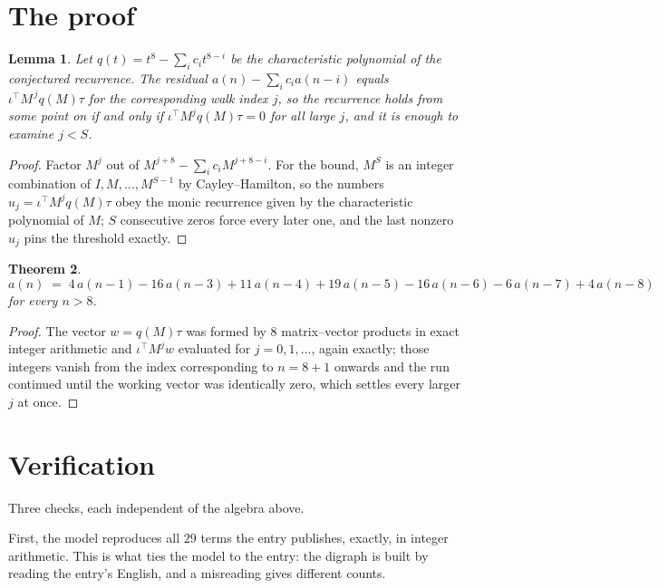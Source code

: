 \documentclass[11pt,a4paper]{article}
\theoremstyle{plain}
\newtheorem{theorem}{Theorem}
\newtheorem{lemma}[theorem]{Lemma}
\theoremstyle{definition}
\begin{document}
\section{The proof}

\begin{lemma}\label{lem:crit}
Let $q(t)=t^{8}-\sum_i c_it^{8-i}$ be the characteristic polynomial of the
conjectured recurrence. The residual $a(n)-\sum_ic_ia(n-i)$ equals
$\iota^{\!\top}M^{\,j}q(M)\tau$ for the corresponding walk index $j$, so the recurrence
holds from some point on if and only if $\iota^{\!\top}M^{j}q(M)\tau=0$ for all large $j$,
and it is enough to examine $j<S$.
\end{lemma}

\begin{proof}
Factor $M^{j}$ out of $M^{j+8}-\sum_ic_iM^{j+8-i}$. For the bound, $M^{S}$
is an integer combination of $I,M,\dots,M^{S-1}$ by Cayley--Hamilton, so the numbers
$u_j=\iota^{\!\top}M^{j}q(M)\tau$ obey the monic recurrence given by the characteristic
polynomial of $M$; $S$ consecutive zeros force every later one, and the last nonzero $u_j$
pins the threshold exactly.
\end{proof}

\begin{theorem}
\[
a(n)\;=\;4\,a(n-1) - 16\,a(n-3) + 11\,a(n-4) + 19\,a(n-5) - 16\,a(n-6) - 6\,a(n-7) + 4\,a(n-8)
\]
for every $n>8$.
\end{theorem}

\begin{proof}
The vector $w=q(M)\tau$ was formed by $8$ matrix--vector products in exact integer
arithmetic and $\iota^{\!\top}M^{j}w$ evaluated for $j=0,1,\dots$, again exactly; those
integers vanish from the index corresponding to $n=8+1$ onwards and the run continued
until the working vector was identically zero, which settles every larger $j$ at once.
\end{proof}

\section{Verification}

Three checks, each independent of the algebra above.

First, the model reproduces all $29$ terms the entry publishes, exactly, in integer
arithmetic. This is what ties the model to the entry: the digraph is built by reading the
entry's English, and a misreading gives different counts.
\end{document}
